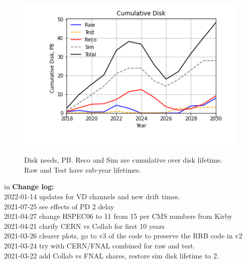 \documentclass[12pt]{article}
\begin{document}
\begin{figure}
\centering\includegraphics[height=0.4\textwidth]{Cumulative-Disk}\label{CumulativeDisk}
\caption{Disk needs, PB.  Reco and Sim are cumulative over disk lifetime.  Raw and Test have sub-year lifetimes.}
\end{figure}
 in\pagebreak 
 {\bf Change log:}\\
2022-01-14 updates for VD channels and new drift times.\\2021-07-25 see effects of PD 2 delay\\2021-04-27 change HSPEC06 to 11 from 15 per CMS numbers from Kirby\\2021-04-21 clarify CERN vs Collab for first 10 years\\2021-03-26 clearer plots, go to v3 of the code to preserve the RRB code in v2\\2021-03-24 try with CERN/FNAL combined for raw and test.\\2021-03-22 add Collab vs FNAL shares, restore sim disk lifetime to 2.\\
\end{document}
